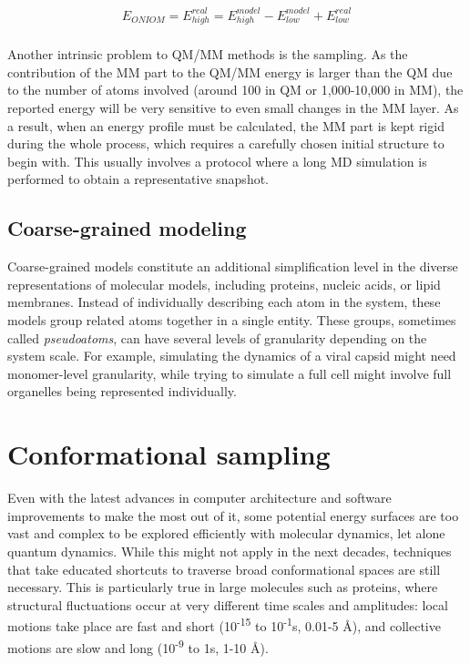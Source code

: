 \begin{align}
  E_{ONIOM}=E_{high}^{real}=E_{high}^{model}-E_{low}^{model}+E_{low}^{real} \\ \tag{ONIOM energy}
\end{align}


Another intrinsic problem to QM/MM methods is the sampling. As the contribution of the MM part to the QM/MM energy is larger than the QM due to the number of atoms involved (around 100 in QM or 1,000-10,000 in MM), the reported energy will be very sensitive to even small changes in the MM layer. As a result, when an energy profile must be calculated, the MM part is kept rigid during the whole process, which requires a carefully chosen initial structure to begin with. This usually involves a protocol where a long MD simulation is performed to obtain a representative snapshot.

\subsection{Coarse-grained modeling}

Coarse-grained models constitute an additional simplification level in the diverse representations of molecular models, including proteins,\cite{Kmiecik_2016,Ing_lfsson_2013} nucleic acids,\cite{Boniecki_2015,Potoyan_2012} or lipid membranes.\cite{Baron_2007} Instead of individually describing each atom in the system, these models group related atoms together in a single entity. These groups, sometimes called \textit{pseudoatoms}, can have several levels of granularity depending on the system scale. For example, simulating the dynamics of a viral capsid might need monomer-level granularity,\cite{Hagan_2016} while trying to simulate a full cell might involve full organelles being represented individually.\cite{pivkin2008accurate}



\section{Conformational sampling}

Even with the latest advances in computer architecture and software improvements to make the most out of it, some potential energy surfaces are too vast and complex to be explored efficiently with molecular dynamics, let alone quantum dynamics. While this might not apply in the next decades, techniques that take educated shortcuts to traverse broad conformational spaces are still necessary. This is particularly true in large molecules such as proteins, where structural fluctuations occur at very different time scales and amplitudes: local motions take place are fast and short (10\textsuperscript{-15} to 10\textsuperscript{-1}s, 0.01-5 \AA), and collective motions are slow and long (10\textsuperscript{-9} to 1s, 1-10 \AA).\cite{brooks1988proteins}

